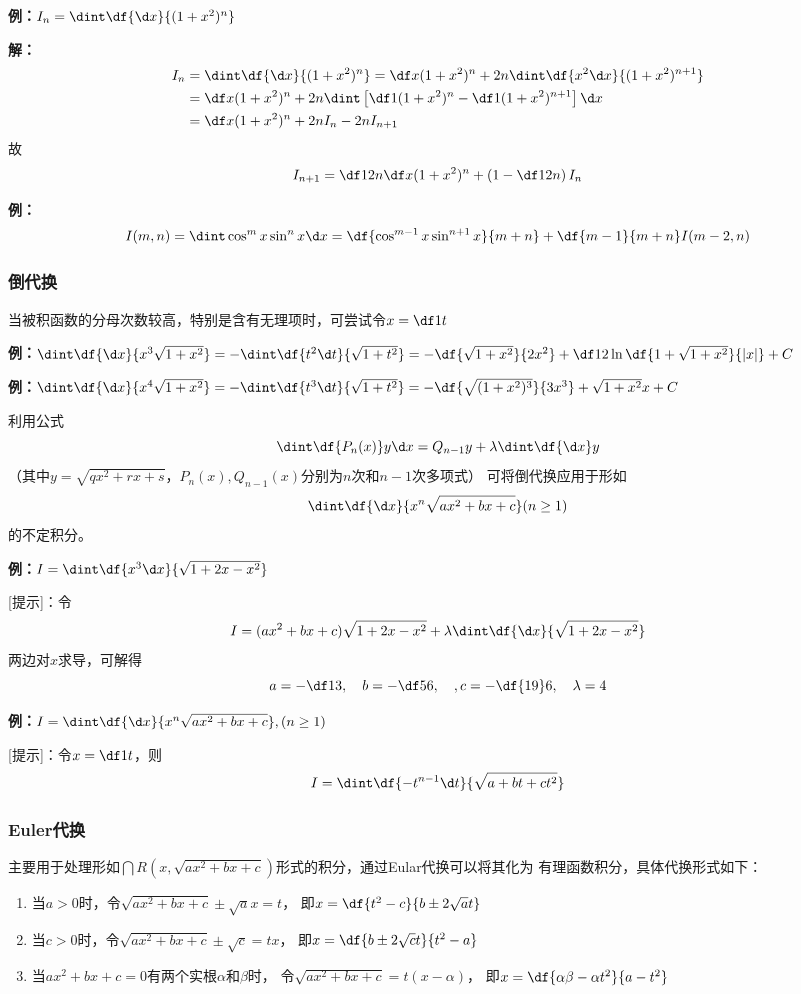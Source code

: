 {\bf 例：}$I_n=\dint\df{\d x}{(1+x^2)^n}$

{\bf 解：}
\begin{align}
I_n&=\dint\df{\d x}{(1+x^2)^n}=\df x{(1+x^2)^n}+2n\dint\df{x^2\d x}
{(1+x^2)^{n+1}}\notag\\
&=\df x{(1+x^2)^n}+2n\dint\left[\df1{(1+x^2)^n}-
\df1{(1+x^2)^{n+1}}\right]\d x\notag\\
&=\df x{(1+x^2)^n}+2nI_n-2nI_{n+1}\notag
\end{align}
故
$$I_{n+1}=\df1{2n}\df x{(1+x^2)^n}+\left(1-\df1{2n}\right)I_n$$
\fin

{\bf 例：}
$$I(m,n)=\dint\cos^mx\sin^nx\d x=
\df{\cos^{m-1}x\sin^{n+1}x}{m+n}+\df{m-1}{m+n}I(m-2,n)$$

\subsubsection{倒代换}

当被积函数的分母次数较高，特别是含有无理项时，可尝试令$x=\df 1t$

{\bf 例：}$\dint\df{\d x}{x^3\sqrt{1+x^2}}=-\dint\df{t^2\d t}{\sqrt{1+t^2}}
=-\df{\sqrt{1+x^2}}{2x^2}+\df12\ln\df{1+\sqrt{1+x^2}}{|x|}+C$

{\bf 例：}$\dint\df{\d x}{x^4\sqrt{1+x^2}}=-\dint\df{t^3\d t}{\sqrt{1+t^2}}
=-\df{\sqrt{(1+x^2)^3}}{3x^3}+\sqrt{1+x^2}x+C$

利用公式
$$\dint\df{P_n(x)}y\d x=Q_{n-1}y+\lambda\dint\df{\d x}y$$
（其中$y=\sqrt{qx^2+rx+s}$，$P_n(x),Q_{n-1}(x)$分别为$n$次和$n-1$次多项式）
可将倒代换应用于形如
$$\dint\df{\d x}{x^n\sqrt{ax^2+bx+c}}(n\geq1)$$
的不定积分。

{\bf 例：}$I=\dint\df{x^3\d x}{\sqrt{1+2x-x^2}}$

[提示]：令
$$I=(ax^2+bx+c)\sqrt{1+2x-x^2}+\lambda\dint\df{\d x}{\sqrt{1+2x-x^2}}$$
两边对$x$求导，可解得
$$a=-\df13,\quad b=-\df56,\quad,c=-\df{19}6,\quad\lambda=4$$

{\bf 例：}$I=\dint\df{\d x}{x^n\sqrt{ax^2+bx+c}},(n\geq 1)$

[提示]：令$x=\df 1t$，则
$$I=\dint\df{-t^{n-1}\d t}{\sqrt{a+bt+ct^2}}$$


\subsubsection{Euler代换}

主要用于处理形如$\dint R(x,\sqrt{ax^2+bx+c})$形式的积分，通过Eular代换可以将其化为
有理函数积分，具体代换形式如下：
\begin{enumerate}
  \setlength{\itemindent}{1cm}
  \item 当$a>0$时，令$\sqrt{ax^2+bx+c}\pm\sqrt ax=t$，
  即$x=\df{t^2-c}{b\pm2\sqrt at}$
  \item 当$c>0$时，令$\sqrt{ax^2+bx+c}\pm\sqrt c=tx$，
  即$x=\df{b\pm2\sqrt ct}{t^2-a}$
  \item 当$ax^2+bx+c=0$有两个实根$\alpha$和$\beta$时，
  令$\sqrt{ax^2+bx+c}=t(x-\alpha)$，
  即$x=\df{\alpha\beta-\alpha t^2}{a-t^2}$
\end{enumerate}

